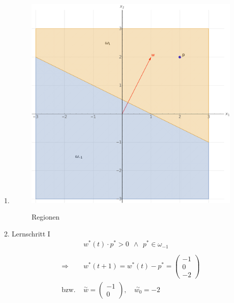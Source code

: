 \documentclass{article}
\begin{document}
\begin{enumerate}[label=\arabic*.]
  \item
        \begin{figure}[H]
          \textit{}\centering
          \includegraphics[width=\textwidth]{separation-regions1.pdf}
          \caption{Regionen}
        \end{figure}
  \item Lernschritt I
        \begin{align*}
                        & w^*(t) \cdot p^* > 0 \ \ \wedge \ \ p^* \in \omega_{-1}                     \\ \\
          \Rightarrow   & w^*(t+1) = w^*(t) - p^* = \begin{pmatrix} -1 \\ 0 \\ -2 \end{pmatrix}                         \\
          \text{bzw.  } & \overset{\sim}{w}=\begin{pmatrix}-1 \\ 0\end{pmatrix}, \quad \overset{\sim}{w_0} = -2
        \end{align*}

\end{enumerate}
\end{document}
